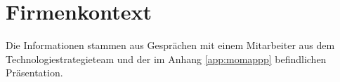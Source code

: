 \chapter{Firmenkontext}\label{ch:Firmenkontext}
Die Informationen stammen aus Gesprächen mit einem Mitarbeiter aus dem Technologiestrategieteam und der im Anhang \ref{app:momappp} befindlichen Präsentation.
